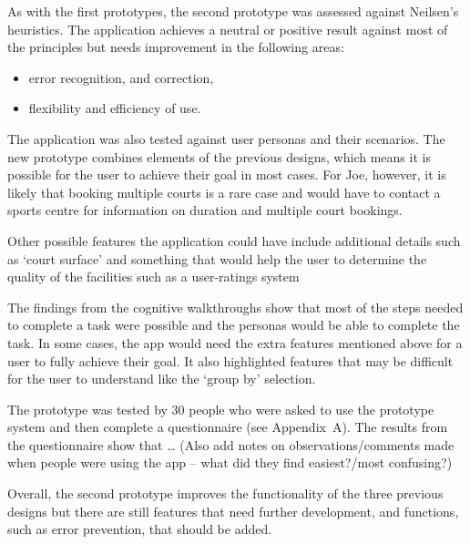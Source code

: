 As with the first prototypes, the second prototype was assessed against
Neilsen’s heuristics. The application achieves a neutral or positive result
against most of the principles but needs improvement in the following areas:
\begin{itemize}
	\item error recognition, and correction,
	\item flexibility and efficiency of use.
\end{itemize}

The application was also tested against user personas and their scenarios. The
new prototype combines elements of the previous designs, which means it is
possible for the user to achieve their goal in most cases. For Joe, however, it
is likely that booking multiple courts is a rare case and would have to contact
a sports centre for information on duration and multiple court bookings.

Other possible features the application could have include additional details
such as `court surface' and something that would help the user to determine the
quality of the facilities such as a user-ratings system

The findings from the cognitive walkthroughs show that most of the steps needed
to complete a task were possible and the personas would be able to complete the
task. In some cases, the app would need the extra features mentioned above for
a user to fully achieve their goal. It also highlighted features that may be
difficult for the user to understand like the `group by' selection.

The prototype was tested by 30 people who were asked to use the prototype
system and then complete a questionnaire (see Appendix~A). The results from the
questionnaire show that … (Also add notes on observations/comments made when
people were using the app – what did they find easiest?/most confusing?)

Overall, the second prototype improves the functionality of the three previous
designs but there are still features that need further development, and
functions, such as error prevention, that should be added.
